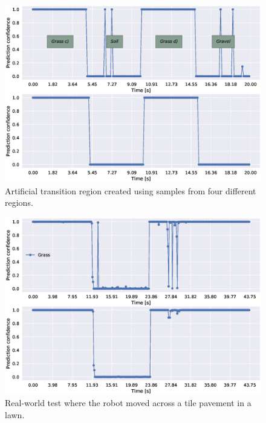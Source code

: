 \begin{figure}
	\centering
	\includegraphics[scale=0.5]{figs_temp/varmats2}
	\caption{Artificial transition region created using samples from four different regions.}
\end{figure}

\begin{figure}
	\centering
	\includegraphics[scale=0.5]{figs_temp/transition_grass_tiles_grass}
	\caption{Real-world test where the robot moved across a tile pavement in a lawn.} 
	\label{fig:trans_tgtg}
\end{figure}


